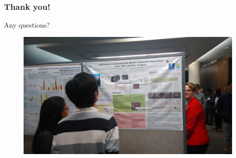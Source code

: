 \documentclass{beamer}
\begin{document}
\begin{frame}

\frametitle{Thank you!}

Any questions?

\begin{figure}
	\includegraphics[width=.7\linewidth]{figs/P_20190424_134152.jpg}
\end{figure}



\end{frame}
\end{document}
